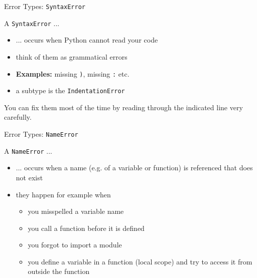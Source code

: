 \begin{frame}{Error Types: \texttt{SyntaxError}}

    A \texttt{SyntaxError} ...

    \begin{itemize}
        \item ... occurs when Python cannot read your code
        \item think of them as grammatical errors
        \item \textbf{Examples:} missing \texttt{)}, missing \texttt{:} etc.
        \item a subtype is the \texttt{IndentationError}
    \end{itemize}

    You can fix them most of the time by reading through the indicated line very carefully.

\end{frame}

\begin{frame}{Error Types: \texttt{NameError}}

    A \texttt{NameError} ...

    \begin{itemize}
        \item ... occurs when a name (e.g. of a variable or function) is referenced that does not exist
        \item they happen for example when
        \begin{itemize}
            \item you misspelled a variable name
            \item you call a function before it is defined
            \item you forgot to import a module
            \item you define a variable in a function (local scope) and try to access it from outside the function
        \end{itemize}
    \end{itemize}

\end{frame}

